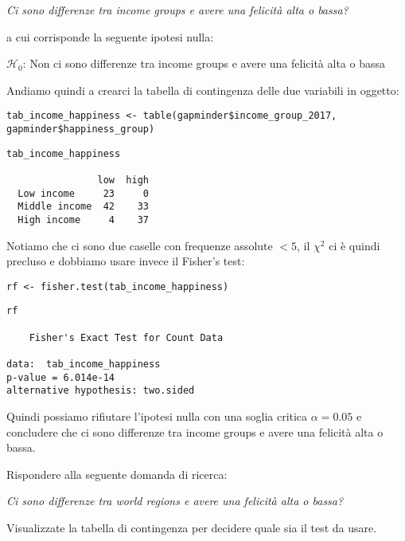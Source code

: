 \centerline{\emph{Ci sono differenze tra income groups e avere una felicit\`a alta o bassa?}}

\vspace{0.2cm}

\noindent a cui corrisponde la seguente ipotesi nulla:

\vspace{0.2cm}

\noindent $\mathcal{H}_0$: Non ci sono differenze tra income groups e avere una felicit\`a alta o bassa

\vspace{0.2cm}

\noindent Andiamo quindi a crearci la tabella di contingenza delle due variabili in oggetto:

\begin{lstlisting}[style=Rstylescript]
tab_income_happiness <- table(gapminder$income_group_2017, gapminder$happiness_group)
\end{lstlisting}

\begin{lstlisting}[style=Rstyle]
tab_income_happiness 
       
                low  high
  Low income     23     0
  Middle income  42    33
  High income     4    37
\end{lstlisting}
%
Notiamo che ci sono due caselle con frequenze assolute $< 5$, il $\chi^2$ ci \`e quindi precluso e dobbiamo usare invece il Fisher's test:

\begin{lstlisting}[style=Rstylescript]
rf <- fisher.test(tab_income_happiness)
\end{lstlisting}
%

\begin{lstlisting}[style=Rstyle]
rf

	Fisher's Exact Test for Count Data

data:  tab_income_happiness
p-value = 6.014e-14
alternative hypothesis: two.sided				 
\end{lstlisting}
%
Quindi possiamo rifiutare l'ipotesi nulla con una soglia critica $\alpha = 0.05$ e concludere che ci sono differenze tra income groups e avere una felicit\`a alta o bassa.


\vspace{0.5cm} 

\begin{exercise}\label{ex5.6}

\noindent Rispondere alla seguente domanda di ricerca: 

\centerline{\emph{Ci sono differenze tra world regions e avere una felicit\`a alta o bassa?}}

	\begin{myitemize}
		\item Visualizzate la tabella di contingenza per decidere quale sia il test da usare.
	\end{myitemize}

\end{exercise}








